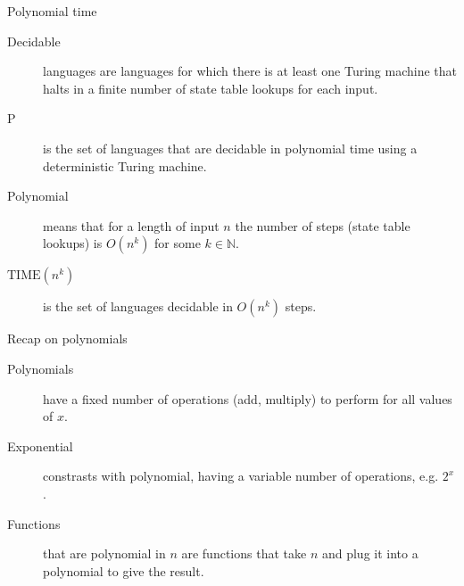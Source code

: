 \begin{frame}{Polynomial time}
  
  
  \begin{description}
    \item[Decidable] languages are languages for which there is at least one Turing machine that halts in a finite number of state table lookups for each input.
    \item[P] is the set of languages that are decidable in polynomial time using a deterministic Turing machine.
    \item[Polynomial] means that for a length of input \( n \) the number of steps (state table lookups) is \( O(n^k) \) for some \( k \in \mathbb{N} \).
    \item[\( \text{TIME}(n^k) \)] is the set of languages decidable in \( O(n^k) \) steps.
  \end{description}

\end{frame}


\begin{frame}[fragile]{Recap on polynomials}
  
  
  \begin{description}
    \item[Polynomials] have a fixed number of operations (add, multiply) to perform for all values of \( x \).
    \item[Exponential] constrasts with polynomial, having a variable number of operations, e.g. \( 2^x \).
    \item[Functions] that are polynomial in $n$ are functions that take $n$ and plug it into a polynomial to give the result.
  \end{description}

  \begin{adjustbox}{max width={0.4\textwidth}, center}
  \end{adjustbox}

\end{frame}


